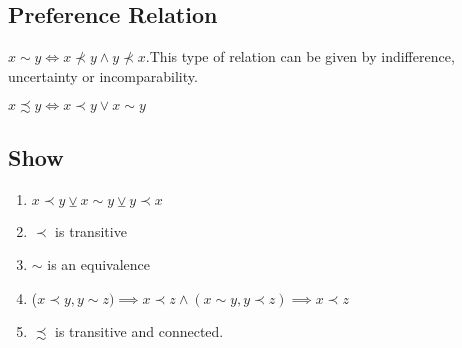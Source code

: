 \documentclass{article}
\begin{document}
\subsection*{Preference Relation}

 $x\sim y\iff x\not\prec y \wedge y\not\prec x$.This
type of relation can be given by indifference, uncertainty or incomparability.

 $x\precsim y \iff x\prec y \vee x\sim y$

\subsection*{Show}
\begin{enumerate}
\item $x\prec y \veebar x\sim y \veebar y\prec x$
\item $\prec$ is transitive
\item $\sim$ is an equivalence
\item ($x\prec y, y\sim z)\implies x\prec z \wedge (x\sim y, y\prec z)\implies
x\prec z$
\item $\precsim$ is transitive and connected.
\end{enumerate}
\end{document}
